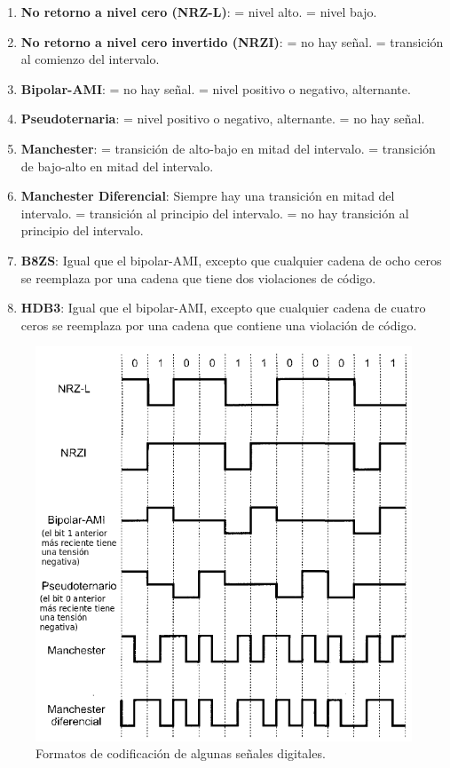 \documentclass[10pt,a4paper]{article}
\begin{document}
\begin{multicols}{2}
\begin{enumerate}
\item \textbf{No retorno a nivel cero (NRZ-L)}:
 = nivel alto.
 = nivel bajo.
\item \textbf{No retorno a nivel cero invertido (NRZI)}:
 = no hay señal.
 = transición al comienzo del intervalo.
\item \textbf{Bipolar-AMI}:
 = no hay señal.
 = nivel positivo o negativo, alternante.
\item \textbf{Pseudoternaria}:
 = nivel positivo o negativo, alternante.
 = no hay señal.
\vfill
\item \textbf{Manchester}:
 = transición de alto-bajo en mitad del intervalo.
 = transición de bajo-alto en mitad del intervalo.
\item \textbf{Manchester Diferencial}:
\subitem Siempre hay una transición en mitad del intervalo.
 = transición al principio del intervalo.
 = no hay transición al principio del intervalo.
\item \textbf{B8ZS}:
\subitem Igual que el bipolar-AMI, excepto que cualquier cadena de ocho ceros se reemplaza por una cadena que tiene dos violaciones de código.
\item \textbf{HDB3}: 
\subitem Igual que el bipolar-AMI, excepto que cualquier cadena de cuatro ceros se reemplaza por una cadena que contiene una violación de código.
\end{enumerate}
\end{multicols}

\begin{figure}[ht!]
  \caption{Formatos de codificación de algunas señales digitales.}
  \label{fig:codificaciones}  
  \centerline{
	\includegraphics[width=0.8\textwidth-\fboxrule-\fboxrule]{imgs/codificaciones.png}}
\end{figure}
\end{document}
